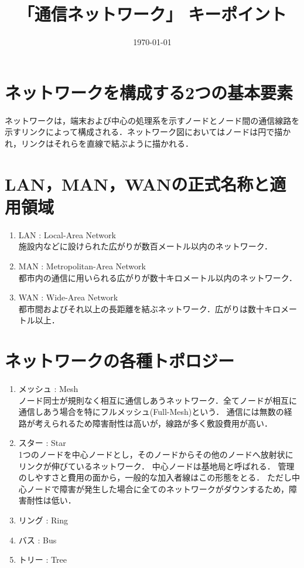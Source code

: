 \documentclass[10.5pt]{jsarticle}
\title{「通信ネットワーク」 キーポイント}
\date{\today}
\author{}
\begin{document}
\maketitle
\thispagestyle{fancy}

\section{ネットワークを構成する2つの基本要素}
ネットワークは，端末および中心の処理系を示すノードとノード間の通信線路を示すリンクによって構成される．ネットワーク図においてはノードは円で描かれ，リンクはそれらを直線で結ぶように描かれる．

\section{LAN，MAN，WANの正式名称と適用領域}
\begin{enumerate}
\item{LAN : Local-Area Network}\\
施設内などに設けられた広がりが数百メートル以内のネットワーク．
\item{MAN : Metropolitan-Area Network}\\
都市内の通信に用いられる広がりが数十キロメートル以内のネットワーク．
\item{WAN : Wide-Area Network}\\
都市間およびそれ以上の長距離を結ぶネットワーク．広がりは数十キロメートル以上．
\end{enumerate}

\section{ネットワークの各種トポロジー}
\begin{enumerate}
\item{メッシュ : Mesh}\\
ノード同士が規則なく相互に通信しあうネットワーク．全てノードが相互に通信しあう場合を特にフルメッシュ(Full-Mesh)という．
通信には無数の経路が考えられるため障害耐性は高いが，線路が多く敷設費用が高い．
\item{スター : Star}\\
1つのノードを中心ノードとし，そのノードからその他のノードへ放射状にリンクが伸びているネットワーク．
中心ノードは基地局と呼ばれる．
管理のしやすさと費用の面から，一般的な加入者線はこの形態をとる．
ただし中心ノードで障害が発生した場合に全てのネットワークがダウンするため，障害耐性は低い．
\item{リング : Ring}\\
\item{バス : Bus}\\
\item{トリー : Tree}\\
\end{enumerate}
\end{document}
